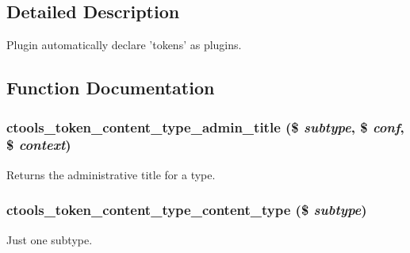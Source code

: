 \subsection{Detailed Description}
Plugin automatically declare 'tokens' as plugins. 

\subsection{Function Documentation}
\hypertarget{content__types_2token_2token_8inc_acf7c27f3aec78e6b907806c2527263a2}{
\subsubsection[{ctools\_\-token\_\-content\_\-type\_\-admin\_\-title}]{\setlength{\rightskip}{0pt plus 5cm}ctools\_\-token\_\-content\_\-type\_\-admin\_\-title (\$ {\em subtype}, \/  \$ {\em conf}, \/  \$ {\em context})}}
\label{content__types_2token_2token_8inc_acf7c27f3aec78e6b907806c2527263a2}
Returns the administrative title for a type. \hypertarget{content__types_2token_2token_8inc_a354dcbc5f21429cb31aea2c89389461d}{
\subsubsection[{ctools\_\-token\_\-content\_\-type\_\-content\_\-type}]{\setlength{\rightskip}{0pt plus 5cm}ctools\_\-token\_\-content\_\-type\_\-content\_\-type (\$ {\em subtype})}}
\label{content__types_2token_2token_8inc_a354dcbc5f21429cb31aea2c89389461d}
Just one subtype.

